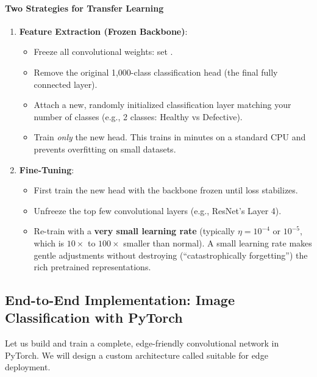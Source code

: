 \paragraph{Two Strategies for Transfer Learning}
\begin{enumerate}
    \item \textbf{Feature Extraction (Frozen Backbone)}:
    \begin{itemize}
        \item Freeze all convolutional weights: set .
        \item Remove the original 1,000-class classification head (the final fully connected layer).
        \item Attach a new, randomly initialized classification layer matching your number of classes (e.g., 2 classes: Healthy vs Defective).
        \item Train \emph{only} the new head. This trains in minutes on a standard CPU and prevents overfitting on small datasets.
    \end{itemize}
    \item \textbf{Fine-Tuning}:
    \begin{itemize}
        \item First train the new head with the backbone frozen until loss stabilizes.
        \item Unfreeze the top few convolutional layers (e.g., ResNet's Layer 4).
        \item Re-train with a \textbf{very small learning rate} (typically $\eta = 10^{-4}$ or $10^{-5}$, which is $10\times$ to $100\times$ smaller than normal). A small learning rate makes gentle adjustments without destroying (``catastrophically forgetting'') the rich pretrained representations.
    \end{itemize}
\end{enumerate}

\subsection{End-to-End Implementation: Image Classification with PyTorch}\label{subsec:pytorch_cnn}

Let us build and train a complete, edge-friendly convolutional network in PyTorch. We will design a custom architecture called  suitable for edge deployment.

